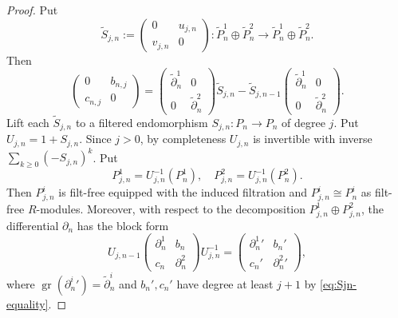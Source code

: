 \documentclass[11pt,a4paper]{article} %
\def\gr{\operatorname{gr}}
\begin{document}
\begin{proof}
Put 
\[
\widetilde{S}_{j,n}
    :=
    \begin{pmatrix}
        0 & u_{j,n}\\
        v_{j,n} & 0
    \end{pmatrix}
    :\widetilde{P}^1_n\oplus\widetilde{P}^2_n
    \longrightarrow
    \widetilde{P}^1_n\oplus\widetilde{P}^2_n.
\]
Then
\begin{equation}\label{eq:Sjn-equality}
    \begin{pmatrix}
        0 & b_{n,j}\\
        c_{n,j} & 0
    \end{pmatrix}
    =
       \begin{pmatrix}
        \widetilde{\partial}^1_n & 0\\
        0 & \widetilde{\partial}^2_n
    \end{pmatrix}   
    \widetilde{S}_{j,n}-\widetilde{S}_{j,n-1}
    \begin{pmatrix}
        \widetilde{\partial}^1_n & 0\\
        0 & \widetilde{\partial}^2_n
    \end{pmatrix}.
\end{equation}
Lift each $\widetilde{S}_{j,n}$ to a filtered endomorphism $S_{j,n}:P_n\rightarrow P_n$ of degree $j$. Put $U_{j,n}=1+S_{j,n}$. Since $j>0$, by completeness $U_{j,n}$ is invertible with inverse $\sum_{k\ge0}(-S_{j,n})^k$. Put 
\[
P^1_{j,n}=U_{j,n}^{-1}(P_n^1),\quad P^2_{j,n}=U_{j,n}^{-1}(P_n^2).
\]
Then $P^i_{j,n}$ is filt-free equipped with the induced filtration and $P^i_{j,n}\cong P_n^i$ as filt-free $R$-modules. Moreover, with respect to the decomposition $P^1_{j,n}\oplus P^2_{j,n}$, the differential $\partial_n$ has the block form 
\[
    U_{j,n-1}
    \begin{pmatrix}
        \partial^1_n & b_n\\
        c_n & \partial^2_n
    \end{pmatrix}
    U_{j,n}^{-1}=
    \begin{pmatrix}
        {\partial^1_n}' & {b_n}'\\
        {c_n}' & {\partial^2_n}'
    \end{pmatrix},
\]
where $\gr({\partial^i_n}')=\widetilde{\partial}^i_n$ and ${b_n}',{c_n}'$ have degree at least $j+1$ by \eqref{eq:Sjn-equality}.


\end{proof}
\end{document}
